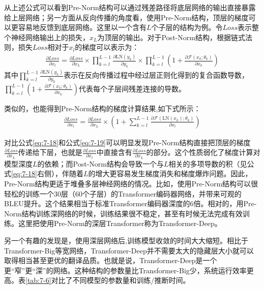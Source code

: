 \parinterval 从上述公式可以看到Pre-Norm结构可以通过残差路径将底层网络的输出直接暴露给上层网络；另一方面从反向传播的角度看，使用Pre-Norm结构，顶层的梯度可以更容易地反馈到底层网络。这里以一个含有$L$个子层的结构为例。令$Loss$表示整个神经网络输出上的损失，$x_L$为顶层的输出。对于Post-Norm结构，根据链式法则，损失$Loss$相对于$x_l$的梯度可以表示为：
\begin{eqnarray}
\frac{\partial Loss}{\partial x_l}=\frac{\partial Loss}{\partial x_L} \times \prod_{k=l}^{L-1}\frac{\partial \textrm{LN}(y_k)}{\partial y_k} \times \prod_{k=l}^{L-1}(1+\frac{\partial \mathcal{F}(x_k;\theta_k)}{\partial x_k})
\label{eq:7-18}
\end{eqnarray}
其中$\prod_{k=l}^{L-1}\frac{\partial \textrm{LN}(y_k)}{\partial y_k}$表示在反向传播过程中经过层正则化得到的复合函数导数，$\prod_{k=l}^{L-1}(1+\frac{\partial \mathcal{F}(x_k;\theta_k)}{\partial x_k})$代表每个子层间残差连接的导数。

\parinterval 类似的，也能得到Pre-Norm结构的梯度计算结果,如下式所示：
\begin{eqnarray}
\frac{\partial Loss}{\partial x_l}=\frac{\partial Loss}{\partial x_L} \times (1+\sum_{k=l}^{L-1}\frac{\partial \mathcal{F}(\textrm{LN}(x_k);\theta_k)}{\partial x_l})
\label{eq:7-19}
\end{eqnarray}

\parinterval 对比公式\ref{eq:7-18}和公式\ref{eq:7-19}可以明显发现Pre-Norm结构直接把顶层的梯度$\frac{\partial Loss}{\partial x_L}$传递给下层，也就是$\frac{\partial Loss}{\partial x_l}$中直接含有$\frac{\partial Loss}{\partial x_L}$的部分。这个性质弱化了梯度计算对模型深度$L$的依赖；而Post-Norm结构会导致一个与$L$相关的多项导数的积（见公式\ref{eq:7-18}右侧），伴随着$L$的增大更容易发生梯度消失和梯度爆炸问题。因此，Pre-Norm结构更适于堆叠多层神经网络的情况。比如，使用Pre-Norm结构可以很轻松的训练一个30层（60个子层）的Transformer编码器网络，并带来可观的BLEU提升。这个结果相当于标准Transformer编码器深度的6倍\cite{WangLearning}。相对的，用Pre-Norm结构训练深网络的时候，训练结果很不稳定，甚至有时候无法完成有效训练。这里把使用Pre-Norm的深层Transformer称为Transformer-Deep。

\parinterval 另一个有趣的发现是，使用深层网络后,训练模型收敛的时间大大缩短。相比于Transformer-Big等宽网络，Transformer-Deep并不需要太大的隐藏层大小就可以取得相当甚至更优的翻译品质。也就是说，Transformer-Deep是一个更``窄''更``深''的网络。这种结构的参数量比Transformer-Big少，系统运行效率更高。表\ref{tab:7-6}对比了不同模型的参数量和训练/推断时间。

